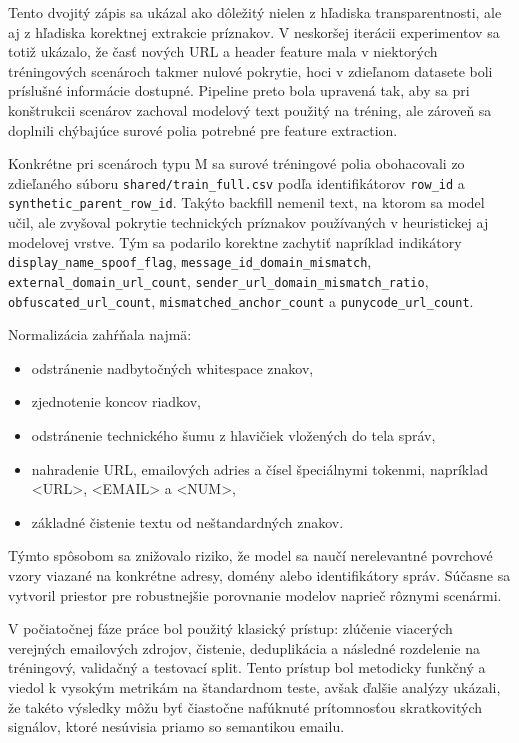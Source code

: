 \documentclass[conference]{IEEEtran}
\begin{document}
Tento dvojitý zápis sa ukázal ako dôležitý nielen z hľadiska transparentnosti, ale aj z hľadiska korektnej extrakcie príznakov. V neskoršej iterácii experimentov sa totiž ukázalo, že časť nových URL a header feature mala v niektorých tréningových scenároch takmer nulové pokrytie, hoci v zdieľanom datasete boli príslušné informácie dostupné. Pipeline preto bola upravená tak, aby sa pri konštrukcii scenárov zachoval modelový text použitý na tréning, ale zároveň sa doplnili chýbajúce surové polia potrebné pre feature extraction.

Konkrétne pri scenároch typu M sa surové tréningové polia obohacovali zo zdieľaného súboru \texttt{shared/train\_full.csv} podľa identifikátorov \texttt{row\_id} a \texttt{synthetic\_parent\_row\_id}. Takýto backfill nemenil text, na ktorom sa model učil, ale zvyšoval pokrytie technických príznakov používaných v heuristickej aj modelovej vrstve. Tým sa podarilo korektne zachytiť napríklad indikátory \texttt{display\_name\_spoof\_flag}, \texttt{message\_id\_domain\_mismatch}, \texttt{external\_domain\_url\_count}, \texttt{sender\_url\_domain\_mismatch\_ratio}, \texttt{obfuscated\_url\_count}, \texttt{mismatched\_anchor\_count} a \texttt{punycode\_url\_count}.

Normalizácia zahŕňala najmä:
\begin{itemize}
    \item odstránenie nadbytočných whitespace znakov,
    \item zjednotenie koncov riadkov,
    \item odstránenie technického šumu z hlavičiek vložených do tela správ,
    \item nahradenie URL, emailových adries a čísel špeciálnymi tokenmi, napríklad <URL>, <EMAIL> a <NUM>,
    \item základné čistenie textu od neštandardných znakov.
\end{itemize}

Týmto spôsobom sa znižovalo riziko, že model sa naučí nerelevantné povrchové vzory viazané na konkrétne adresy, domény alebo identifikátory správ. Súčasne sa vytvoril priestor pre robustnejšie porovnanie modelov naprieč rôznymi scenármi.

V počiatočnej fáze práce bol použitý klasický prístup: zlúčenie viacerých verejných emailových zdrojov, čistenie, deduplikácia a následné rozdelenie na tréningový, validačný a testovací split. Tento prístup bol metodicky funkčný a viedol k vysokým metrikám na štandardnom teste, avšak ďalšie analýzy ukázali, že takéto výsledky môžu byť čiastočne nafúknuté prítomnosťou skratkovitých signálov, ktoré nesúvisia priamo so semantikou emailu.
\end{document}
